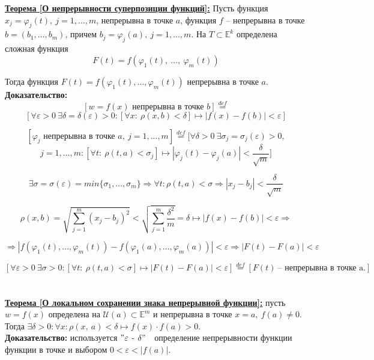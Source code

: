 \documentclass[a4paper,12pt]{article} %
\begin{document}
\underline{\textbf{Теорема [О непрерывности суперпозиции функций]:}} Пусть функция $x_j = \varphi_j(t),~ j = 1, ..., m$, непрерывна в точке $a$, функция $f$ -- непрерывна в точке $b = (b_1, ..., b_m)$, причем $b_j = \varphi_j(a), ~ j = 1, ..., m$.
На $T \subset \mathbb{E}^k$ определена сложная функция 
\[F(t) = f(\varphi_1(t),~ ..., ~\varphi_m(t))\]

Тогда функция $F(t) = f(\varphi_1(t), ..., \varphi_m(t))$ непрерывна в точке $a$.\\

\textbf{Доказательство:}\\ 
\[ [w = f(x) \text{ непрерывна в точке } b] \stackrel{def}{=} \]
\[[\forall \varepsilon > 0~\exists\delta = \delta(\varepsilon) > 0: [\forall x: ~  \rho (x, b) < \delta] \mapsto |f(x) - f(b)| < \varepsilon]\]

\[ [\varphi_j \text{ непрерывна в точке } a, ~ j = 1, ..., m] \stackrel{def}{=} [\forall \delta > 0~\exists\sigma_j = \sigma_j(\varepsilon) > 0,\]
\[j = 1, ..., m:
[\forall t: ~ \rho (t, a) < \sigma_j] \mapsto |\varphi_j(t) - \varphi_j(a)| < \frac{\delta}{\sqrt{m}}]\]

\[\exists \sigma = \sigma(\varepsilon) = min\{\sigma_1, ..., \sigma_m\} \Rightarrow \forall t: \rho(t, a) < \sigma \Rightarrow |x_j - b_j| < \frac{\delta}{\sqrt{m}}\]

\[ \rho(x, b) = \sqrt{\sum\limits_{j = 1}^{m}(x_j - b_j)^2} < \sqrt{\sum\limits_{j = 1}^{m}\frac{\delta^2}{m}} = \delta \mapsto |f(x) - f(b)| < \varepsilon \Rightarrow\]

\[\Rightarrow |f(\varphi_1(t), ..., \varphi_m(t)) - f(\varphi_1(a), ..., \varphi_m(a))| < \varepsilon \Rightarrow |F(t) - F(a)| < \varepsilon \]

\[[\forall \varepsilon > 0 ~\exists\sigma > 0: [\forall t: ~\rho(t, a) < \sigma] \mapsto |F(t) - F(a)| < \varepsilon]\stackrel{def}{=} [F(t) ~\text{-- непрерывна в точке a.}]\]\\\\

\underline{\textbf{Теорема [О локальном сохранении знака непрерывной функции]:}} пусть $w = f(x)$ определена на $\mathscr{U}(a) \subset \mathbb{E}^m$ и непрерывна в точке $x = a,~ f(a) \neq 0.$
Тогда $\exists \delta > 0: \forall x: \rho(x,~ a) < \delta \mapsto f(x)\cdot f(a) > 0.$\\

\textbf{Доказательство:} используется $"\varepsilon$ - $\delta"\quad$определение непрерывности функции
функции в точке и выбором $0 < \varepsilon < |f(a)|.$\\
\end{document}
